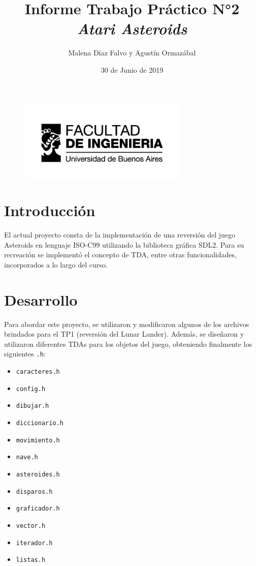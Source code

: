 \documentclass[a4paper, 12pt, spanish]{article}
\title{Informe Trabajo Práctico N°2 \linebreak \textit{Atari Asteroids} \linebreak}
\author{Malena Díaz Falvo y Agustín Ormazábal}
\date{30 de Junio de 2019}
\begin{document}
\begin{figure}[t]
	\includegraphics[width=8cm]{logoFIUBA} 
\end{figure}
\maketitle

\thispagestyle{empty}
\newpage

\setcounter{page}{2}
\pagestyle{plain}

\section*{Introducción}
El actual proyecto consta de la implementación de una reversión del juego
Asteroids en lenguaje ISO-C99 utilizando la biblioteca gráfica SDL2. Para su recreación
se implementó el concepto de TDA, entre otras funcionalidades, incorporados a lo largo
del curso. \newline
 
\section*{Desarrollo}
Para abordar este proyecto, se utilizaron y modificaron algunos de los archivos brindados para el TP1 (reversión del Lunar 
Lander). Además, se diseñaron y utilizaron diferentes TDAs para los objetos del juego, obteniendo finalmente los siguientes \texttt{.h}:

\begin{multicols}{2}
\begin{itemize}[label=$\bullet$]

	\item \texttt{caracteres.h}
	\item \texttt{config.h} 
	\item \texttt{dibujar.h}
	\item \texttt{diccionario.h}
	\item \texttt{movimiento.h}
	\item \texttt{nave.h}
	\item \texttt{asteroides.h}
	\item \texttt{disparos.h}
	\item \texttt{graficador.h}
	\item \texttt{vector.h}
	\item \texttt{iterador.h}
	\item \texttt{listas.h}
	

\end{itemize}
\end{multicols}
\medskip
\end{document}

